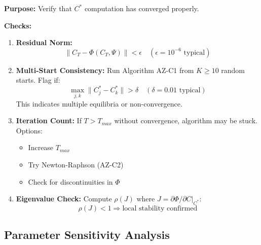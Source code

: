 \begin{tcolorbox}[colback=gray!5!white, colframe=gray!75!black,
    title=Diagnostic Protocol AZ-V2: Convergence Checks]
\textbf{Purpose:} Verify that $C^*$ computation has converged properly.

\textbf{Checks:}
\begin{enumerate}[nosep]
\item \textbf{Residual Norm:}
\begin{equation}
\|C_T - \Phi(C_T, \Psi)\| < \epsilon \quad (\epsilon = 10^{-6} \text{ typical})
\end{equation}

\item \textbf{Multi-Start Consistency:}
Run Algorithm AZ-C1 from $K \geq 10$ random starts. Flag if:
\begin{equation}
\max_{j,k} \|C^*_j - C^*_k\| > \delta \quad (\delta = 0.01 \text{ typical})
\end{equation}
This indicates multiple equilibria or non-convergence.

\item \textbf{Iteration Count:}
If $T > T_{max}$ without convergence, algorithm may be stuck. Options:
\begin{itemize}[nosep]
\item Increase $T_{max}$
\item Try Newton-Raphson (AZ-C2)
\item Check for discontinuities in $\Phi$
\end{itemize}

\item \textbf{Eigenvalue Check:}
Compute $\rho(J)$ where $J = \partial\Phi/\partial C|_{C^*}$:
\begin{equation}
\rho(J) < 1 \Rightarrow \text{local stability confirmed}
\end{equation}
\end{enumerate}
\end{tcolorbox}

\subsection{Parameter Sensitivity Analysis}

